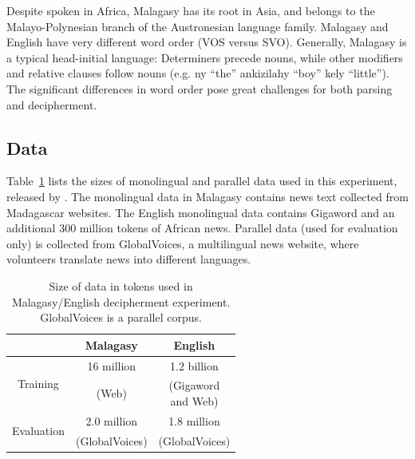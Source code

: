 
Despite spoken in Africa, Malagasy has its root in Asia, and belongs to the Malayo-Polynesian branch of the Austronesian language family. Malagasy and English have very different word order (VOS versus SVO). Generally, Malagasy is a typical head-initial language: Determiners precede nouns, while other modifiers and relative clauses follow nouns (e.g. ny ``the'' ankizilahy ``boy'' kely ``little''). The significant differences in word order pose great challenges for both parsing and decipherment.


\subsection{Data}

Table~\ref{mlg-en-data} lists the sizes of monolingual and parallel data used in this experiment, released by . The monolingual data in Malagasy contains news text collected from Madagascar websites. The English monolingual data contains Gigaword and an additional 300 million tokens of African news. Parallel data (used for evaluation only) is collected from GlobalVoices, a multilingual news website, where volunteers translate news into different languages.

 \begin{table}
 \begin{center}
 \begin{tabular}{ |c|c|c| } \hline
             & Malagasy & English \\ \hline
\multirow{2}{*}{Training} & 16 million & 1.2 billion\\ 
& (Web) & \pbox{2cm}{ (Gigaword \\ and Web)}  \\ \hline
\multirow{2}{*}{Evaluation} & 2.0 million& 1.8 million \\
 & (GlobalVoices) & (GlobalVoices)  \\ \hline
 \end{tabular}
 \caption{Size of data in tokens used in Malagasy/English decipherment experiment. GlobalVoices is a parallel corpus.}
 \label{mlg-en-data}
 \end{center}
 \end{table}
 
